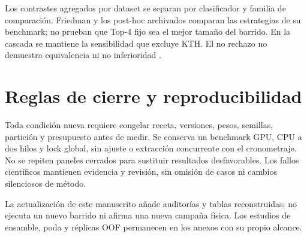 Los contrastes agregados por dataset se separan por clasificador y familia de comparación. Friedman y los post-hoc archivados comparan las estrategias de su benchmark; no prueban que Top-4 fijo sea el mejor tamaño del barrido. En la cascada se mantiene la sensibilidad que excluye KTH. El no rechazo no demuestra equivalencia ni no inferioridad \citep{demsar2006statistical,garcia2008extension}.

\section{Reglas de cierre y reproducibilidad}
Toda condición nueva requiere congelar receta, versiones, pesos, semillas, partición y presupuesto antes de medir. Se conserva un benchmark GPU, CPU a dos hilos y lock global, sin ajuste o extracción concurrente con el cronometraje. No se repiten paneles cerrados para sustituir resultados desfavorables. Los fallos científicos mantienen evidencia y revisión, sin omisión de casos ni cambios silenciosos de método.

La actualización de este manuscrito añade auditorías y tablas reconstruidas; no ejecuta un nuevo barrido ni afirma una nueva campaña física. Los estudios de ensamble, poda y réplicas OOF permanecen en los anexos con su propio alcance.
